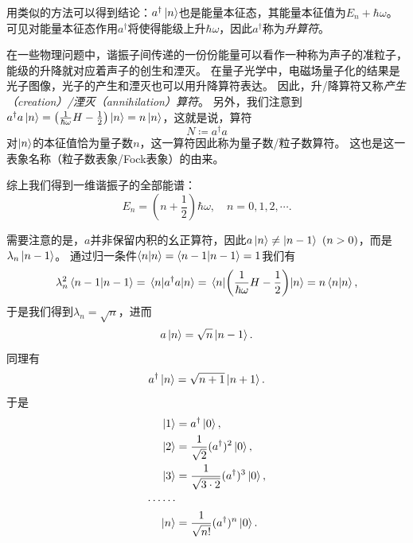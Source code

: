用类似的方法可以得到结论：$a^\dagger\ket{n}$也是能量本征态，其能量本征值为$E_n+\hbar\omega$。
可见对能量本征态作用$a^\dag$将使得能级上升$\hbar\omega$，因此$a^\dag$称为\emph{升算符}。

在一些物理问题中，谐振子间传递的一份份能量可以看作一种称为声子的准粒子，能级的升降就对应着声子的创生和湮灭。
在量子光学中，电磁场量子化的结果是光子图像，光子的产生和湮灭也可以用升降算符表达。
因此，升/降算符又称\emph{产生（creation）/湮灭（annihilation）算符}。
另外，我们注意到$a^\dagger a\ket{n}=\left(\frac{1}{\hbar\omega}H-\frac12\right)\ket{n}=n\ket{n}$，这就是说，算符
\begin{equation}
    N \coloneq a^\dag a
\end{equation}
对$\ket{n}$的本征值恰为量子数$n$，这一算符因此称为量子数/粒子数算符。
这也是这一表象名称（粒子数表象/Fock表象）的由来。

综上我们得到一维谐振子的全部能谱：
\begin{equation}
    E_n = \left(n+\frac12\right) \hbar\omega ,\quad n=0,1,2,\cdots.
\end{equation}

需要注意的是，$a$并非保留内积的幺正算符，因此$a\ket{n}\neq\ket{n-1}\ (n>0)$，而是$\lambda_n\ket{n-1}$。
通过归一条件$\braket{n}{n}=\braket{n-1}{n-1}=1$我们有
\begin{equation}
    \lambda_n^2 \braket{n-1}{n-1} = \mel{n}{a^\dagger a}{n} = \mel{n}{\left(\frac{1}{\hbar\omega}H-\frac12\right)}{n} = n \braket{n}{n},
\end{equation}
于是我们得到$\lambda_n=\sqrt{n}$，进而
\begin{equation}
    a\ket{n} = \sqrt{n}\ket{n-1}.
\end{equation}
同理有
\begin{equation}
    a^\dagger \ket{n} = \sqrt{n+1}\ket{n+1}.
\end{equation}
于是
\begin{equation}
\begin{aligned}
    \ket{1} &= a^\dagger \ket{0}, \\
    \ket{2} &= \frac{1}{\sqrt{2}} (a^\dagger)^2 \ket{0}, \\
    \ket{3} &= \frac{1}{\sqrt{3\cdot 2}} (a^\dagger)^3 \ket{0}, \\
    \cdots \cdots \\
    \ket{n} &= \frac{1}{\sqrt{n!}} (a^\dagger)^n \ket{0}.
\end{aligned}
\end{equation}

